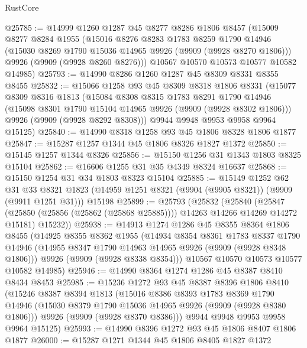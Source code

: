 \begin{lexlean}{RustCore}
\begin{coremodule}
@25785 := @14999
    @1260
    @1287
    @45
    @8277
    @8286
    @1806
    @8457
    (@15009
      @8277
      @8284
      @1955
      (@15016
        @8276
        @8283
        @1783
        @8259
        @1790
        @14946
        (@15030 @8269 @1790 @15036 @14965 @9926 (@9909 (@9928 @8270 @1806)))
        @9926
        (@9909 (@9928 @8260 @8276)))
      @10567
      @10570
      @10573
      @10577
      @10582
      @14985)
@25793 := @14990 @8286 @1260 @1287 @45 @8309 @8331 @8355 @8455
@25832 := @15066
    @1258
    @93
    @45
    @8309
    @8318
    @1806
    @8331
    (@15077
      @8309
      @8316
      @1813
      (@15084
        @8308
        @8315
        @1783
        @8291
        @1790
        @14946
        (@15098 @8301 @1790 @15104 @14965 @9926 (@9909 (@9928 @8302 @1806)))
        @9926
        (@9909 (@9928 @8292 @8308)))
      @9944
      @9948
      @9953
      @9958
      @9964
      @15125)
@25840 := @14990 @8318 @1258 @93 @45 @1806 @8328 @1806 @1877
@25847 := @15287 @1257 @1344 @45 @1806 @8326 @1827 @1372
@25850 := @15145 @1257 @1344 @8326
@25856 := @15150 @1256 @31 @1343 @1803 @8325 @15104
@25862 := @16606 @1255 @31 @35 @4349 @8324 @16637
@25868 := @15150 @1254 @31 @34 @1803 @8323 @15104
@25885 := @15149
    @1252
    @62
    @31
    @33
    @8321
    @1823
    (@14959 @1251 @8321 (@9904 (@9905 @8321)) (@9909 (@9911 @1251 @31)))
    @15198
@25899 := @25793
    (@25832
      (@25840
        (@25847 (@25850 (@25856 (@25862 (@25868 @25885)))) @14263 @14266 @14269 @14272 @15181)
        @15232))
@25938 := @14913
    @1274
    @1286
    @45
    @8355
    @8364
    @1806
    @8455
    (@14925
      @8355
      @8362
      @1955
      (@14934
        @8354
        @8361
        @1783
        @8337
        @1790
        @14946
        (@14955 @8347 @1790 @14963 @14965 @9926 (@9909 (@9928 @8348 @1806)))
        @9926
        (@9909 (@9928 @8338 @8354)))
      @10567
      @10570
      @10573
      @10577
      @10582
      @14985)
@25946 := @14990 @8364 @1274 @1286 @45 @8387 @8410 @8434 @8453
@25985 := @15236
    @1272
    @93
    @45
    @8387
    @8396
    @1806
    @8410
    (@15246
      @8387
      @8394
      @1813
      (@15016
        @8386
        @8393
        @1783
        @8369
        @1790
        @14946
        (@15030 @8379 @1790 @15036 @14965 @9926 (@9909 (@9928 @8380 @1806)))
        @9926
        (@9909 (@9928 @8370 @8386)))
      @9944
      @9948
      @9953
      @9958
      @9964
      @15125)
@25993 := @14990 @8396 @1272 @93 @45 @1806 @8407 @1806 @1877
@26000 := @15287 @1271 @1344 @45 @1806 @8405 @1827 @1372

\end{coremodule}
\end{lexlean}
